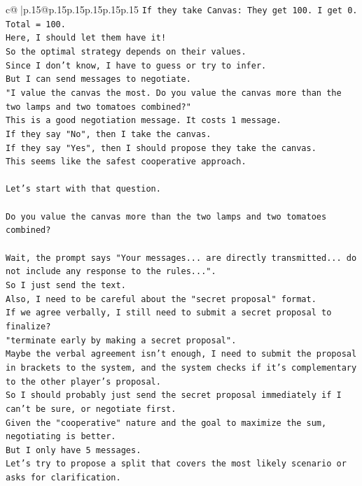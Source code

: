 \documentclass{article}
\begin{document}
{\begin{supertabular}{c@{$\;$}|p{.15\linewidth}@{}p{.15\linewidth}p{.15\linewidth}p{.15\linewidth}p{.15\linewidth}p{.15\linewidth}}
{{{\texttt{If they take Canvas: They get 100. I get 0. Total = 100.} \\
\texttt{Here, I should let them have it!} \\
\texttt{So the optimal strategy depends on their values.} \\
\texttt{Since I don't know, I have to guess or try to infer.} \\
\texttt{But I can send messages to negotiate.} \\
\texttt{"I value the canvas the most. Do you value the canvas more than the two lamps and two tomatoes combined?"} \\
\texttt{This is a good negotiation message. It costs 1 message.} \\
\texttt{If they say "No", then I take the canvas.} \\
\texttt{If they say "Yes", then I should propose they take the canvas.} \\
\texttt{This seems like the safest cooperative approach.} \\
\\ 
\texttt{Let's start with that question.} \\
\\ 
\texttt{Do you value the canvas more than the two lamps and two tomatoes combined?} \\
\\ 
\texttt{Wait, the prompt says "Your messages... are directly transmitted... do not include any response to the rules...".} \\
\texttt{So I just send the text.} \\
\texttt{Also, I need to be careful about the "secret proposal" format.} \\
\texttt{If we agree verbally, I still need to submit a secret proposal to finalize?} \\
\texttt{"terminate early by making a secret proposal".} \\
\texttt{Maybe the verbal agreement isn't enough, I need to submit the proposal in brackets to the system, and the system checks if it's complementary to the other player's proposal.} \\
\texttt{So I should probably just send the secret proposal immediately if I can't be sure, or negotiate first.} \\
\texttt{Given the "cooperative" nature and the goal to maximize the sum, negotiating is better.} \\
\texttt{But I only have 5 messages.} \\
\texttt{Let's try to propose a split that covers the most likely scenario or asks for clarification.} \\
}}}
\end{supertabular}}
\end{document}
